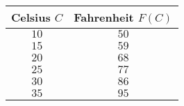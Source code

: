 \begin{tabular}{cc} \toprule
Celsius $C$  & Fahrenheit $F(C)$ \\\midrule
$10$ & $50$ \\
$15$ & $59$ \\
$20$ & $68$ \\
$25$ & $77$ \\
$30$ & $86$ \\
$35$ & $95$ \\\bottomrule
\end{tabular}
